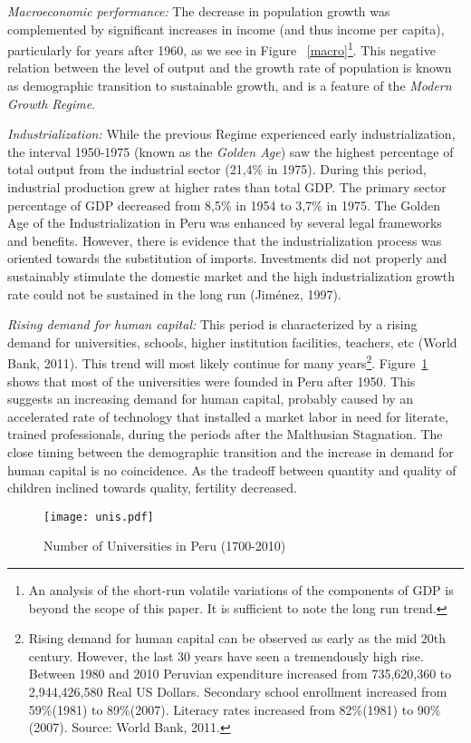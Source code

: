 \documentclass[12pt]{article}%
\begin{document}
\emph{Macroeconomic performance:} The decrease in population growth was complemented by significant increases in income (and thus income per capita), particularly for years after 1960, as we see in Figure ~\ref{macro}\footnote{An analysis of the short-run volatile variations of the components of GDP is beyond the scope of this paper. It is sufficient to note the long run trend.}. This negative relation between the level of output and the growth rate of population is known as demographic transition to sustainable growth, and is a feature of the \emph{Modern Growth Regime}.

\emph{Industrialization:} While the previous Regime experienced early industrialization, the interval 1950-1975 (known as the \emph{Golden Age}) saw the highest percentage of total output from the industrial sector (21,4\% in 1975). During this period, industrial production grew at higher rates than total GDP. The primary sector percentage of GDP decreased from 8,5\% in 1954 to 3,7\% in 1975. The Golden Age of the Industrialization in Peru was enhanced by several legal frameworks and benefits. However, there is evidence that the industrialization process was oriented towards the substitution of imports. Investments did not properly and sustainably stimulate the domestic market and the high industrialization growth rate could not be sustained in the long run (Jim\'enez, 1997).

\emph{Rising demand for human capital:} This period is characterized by a rising demand for universities, schools, higher institution facilities, teachers, etc (World Bank, 2011). This trend will most likely continue for many years\footnote{Rising demand for human capital can be observed as early as the mid 20th century. However, the last 30 years have seen a tremendously high rise. Between 1980 and 2010 Peruvian expenditure increased from 735,620,360 to 2,944,426,580 Real US Dollars. Secondary school enrollment increased from 59\%(1981) to 89\%(2007). Literacy rates increased from 82\%(1981) to 90\%(2007). Source: World Bank, 2011.}. Figure~\ref{universities} shows that most of the universities were founded in Peru after 1950. This suggests an increasing demand for human capital, probably caused by an accelerated rate of technology that installed a market labor in need for literate, trained professionals, during the periods after the Malthusian Stagnation. The close timing between the demographic transition and the increase in demand for human capital is no coincidence. As the tradeoff between quantity and quality of children inclined towards quality, fertility decreased.
\begin{figure}[h]
\caption{Number of Universities in Peru (1700-2010)}
\centering
\texttt{[image: unis.pdf]} \\
\footnotesize
\label{universities}
\end{figure}
\end{document}
